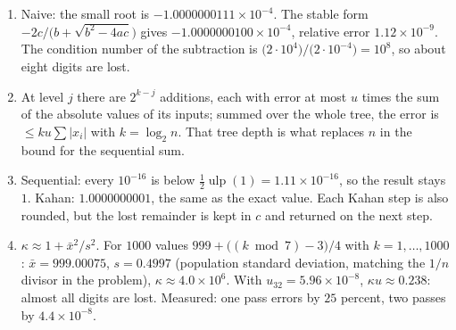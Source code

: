 \begin{enumerate}[label=\textbf{22.\arabic*}]
  \item Naive: the small root is $-1.0000000111\times10^{-4}$. The stable form
        $-2c/\bigl(b+\sqrt{b^{2}-4ac}\bigr)$ gives
        $-1.0000000100\times10^{-4}$, relative error $1.12\times10^{-9}$.
        The condition number of the subtraction is $\bigl(2\cdot10^{4}\bigr)/\bigl(2\cdot
        10^{-4}\bigr)=10^{8}$, so about eight digits are lost.

  \item At level $j$ there are $2^{k-j}$ additions, each with error at most
        $u$ times the sum of the absolute values of its inputs; summed over the whole tree,
        the error is $\le ku\sum|x_{i}|$ with $k=\log_{2}n$. That tree depth is what
        replaces $n$ in the bound for the sequential sum.

  \item Sequential: every $10^{-16}$ is below $\tfrac12\operatorname{ulp}(1)
        =1.11\times10^{-16}$, so the result stays $1$. Kahan:
        $1.0000000001$, the same as the exact value. Each Kahan step is also rounded,
        but the lost remainder is kept in $c$ and returned on the next step.

  \item $\kappa\approx1+\bar x^{2}/s^{2}$. For $1000$ values
        $999+\bigl((k\bmod7)-3\bigr)/4$ with $k=1,\dots,1000$:
        $\bar x=999.00075$, $s=0.4997$ (population standard deviation, matching
        the $1/n$ divisor in the problem),
        $\kappa\approx4.0\times10^{6}$. With $u_{32}=5.96\times10^{-8}$,
        $\kappa u\approx0.238$: almost all digits are lost. Measured: one pass
        errors by $25$ percent, two passes by $4.4\times10^{-8}$.
\end{enumerate}

